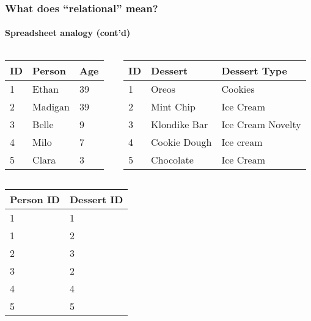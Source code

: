 \documentclass{beamer}
\begin{document}
\begin{frame}
  \frametitle{What does ``relational'' mean?}
  \framesubtitle{Spreadsheet analogy (cont'd)}
  \begin{columns}[T]
    \begin{column}{0.3\textwidth}
      \noindent
      \begin{table}[]
        \footnotesize
        \begin{tabular}{@{}lll@{}}
          \toprule
          ID & Person  & Age \\ \midrule
          1  & Ethan   & 39  \\
          2  & Madigan & 39  \\
          3  & Belle   & 9   \\
          4  & Milo    & 7   \\
          5  & Clara   & 3   \\ \bottomrule
        \end{tabular}
      \end{table}
    \end{column}
    \begin{column}{0.5\textwidth}
      \begin{table}[]
        \footnotesize
        \begin{tabular}{@{}lll@{}}
          \toprule
          ID & Dessert      & Dessert Type      \\ \midrule
          1  & Oreos        & Cookies           \\
          2  & Mint Chip    & Ice Cream         \\
          3  & Klondike Bar & Ice Cream Novelty \\
          4  & Cookie Dough & Ice cream         \\
          5  & Chocolate    & Ice Cream         \\ \bottomrule
        \end{tabular}
      \end{table}
    \end{column}
  \end{columns}

  \begin{table}[]
    \footnotesize
    \begin{tabular}{@{}ll@{}}
      \toprule
      Person ID & Dessert ID \\ \midrule
      1         & 1          \\
      1         & 2          \\
      2         & 3          \\
      3         & 2          \\
      4         & 4          \\
      5         & 5          \\ \bottomrule
    \end{tabular}
  \end{table}
\end{frame}
\end{document}
